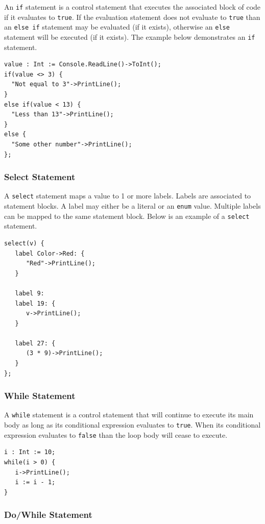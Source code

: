 \documentclass[12pt]{article}
\begin{document}
An \texttt{if} statement is a control statement that executes the associated block of code if it evaluates to \texttt{true}.  If the evaluation statement does not evaluate to \texttt{true} than an \texttt{else if} statement may be evaluated (if it exists), otherwise an \texttt{else} statement will be executed (if it exists).  The example below demonstrates an \texttt{if} statement.

\begin{verbatim}
value : Int := Console.ReadLine()->ToInt();
if(value <> 3) {
  "Not equal to 3"->PrintLine();
}
else if(value < 13) {
  "Less than 13"->PrintLine();
}
else {
  "Some other number"->PrintLine();
};
\end{verbatim}

\subsubsection{Select Statement}

A \texttt{select} statement maps a value to 1 or more labels.  Labels are associated to statement blocks.  A label may either be a literal or an \texttt{enum} value.  Multiple labels can be mapped to the same statement block.  Below is an example of a \texttt{select} statement.

\begin{verbatim}
select(v) {
   label Color->Red: {
      "Red"->PrintLine();
   }

   label 9:
   label 19: {
      v->PrintLine();
   }

   label 27: {
      (3 * 9)->PrintLine();
   }
};
\end{verbatim}

\subsubsection{While Statement}

A \texttt{while} statement is a control statement that will continue to execute its main body as long as its conditional expression evaluates to \texttt{true}.  When its conditional expression evaluates to \texttt{false} than the loop body will cease to execute.

\begin{verbatim}
i : Int := 10;
while(i > 0) {
   i->PrintLine();
   i := i - 1;
}
\end{verbatim}

\subsubsection{Do/While Statement}
\end{document}
